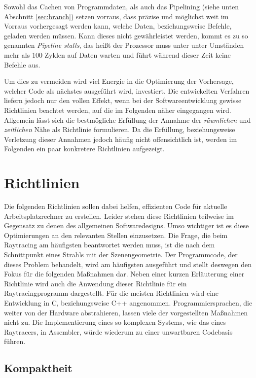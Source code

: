 Sowohl das Cachen von Programmdaten, als auch das Pipelining (siehe unten Abschnitt \ref{sec:branch}) setzen vorraus, dass präzise und möglichst weit im Vorraus vorhergesagt werden kann, welche Daten, beziehungsweise Befehle, geladen werden müssen. Kann dieses nicht gewährleistet werden, kommt es zu so genannten \textit{Pipeline stalls}, das heißt der Prozessor muss unter unter Umständen mehr als 100 Zyklen auf Daten warten und führt während dieser Zeit keine Befehle aus.

Um dies zu vermeiden wird viel Energie in die Optimierung der Vorhersage, welcher Code als nächstes ausgeführt wird, investiert. Die entwickelten Verfahren liefern jedoch nur den vollen Effekt, wenn bei der Softwareentwicklung gewisse Richtlinien beachtet werden, auf die im Folgenden näher eingegangen wird. Allgemein lässt sich die bestmögliche Erfüllung der Annahme der \textit{räumlichen} und \textit{zeitlichen} Nähe als Richtlinie formulieren. Da die Erfüllung, beziehungsweise Verletzung dieser Annahmen jedoch häufig nicht offensichtlich ist, werden im Folgenden ein paar konkretere Richtlinien aufgezeigt.

\section{Richtlinien}

Die folgenden Richtlinien sollen dabei helfen, effizienten Code für aktuelle Arbeitsplatzrechner zu erstellen. Leider stehen diese Richtlinien teilweise im Gegensatz zu denen des allgemeinen Softwaredesigns. Umso wichtiger ist es diese Optimierungen an den relevanten Stellen einzusetzen.
Die Frage, die beim Raytracing am häufigsten beantwortet werden muss, ist die nach dem Schnittpunkt eines Strahls mit der Szenengeometrie. Der Programmcode, der dieses Problem behandelt, wird am häufigsten ausgeführt und stellt deswegen den Fokus für die folgenden Maßnahmen dar. Neben einer kurzen Erläuterung einer Richtlinie wird auch die Anwendung dieser Richtlinie für ein Raytracingprogramm dargestellt.
Für die meisten Richtlinien wird eine Entwicklung in C, beziehungsweise C++ angenommen. Programmiersprachen, die weiter von der Hardware abstrahieren, lassen viele der vorgestellten Maßnahmen nicht zu. Die Implementierung eines so komplexen Systems, wie das eines Raytracers, in Assembler, würde wiederum zu einer unwartbaren Codebasis führen.

\subsection{Kompaktheit}

